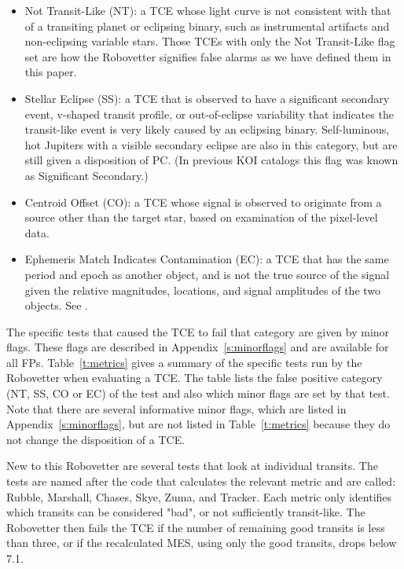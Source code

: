 \begin{itemize}
  \item Not Transit-Like (NT): a TCE whose light curve is not consistent with that of a transiting planet or eclipsing binary, such as instrumental artifacts and non-eclipsing variable stars. Those TCEs  with only the Not Transit-Like flag set are how the Robovetter signifies false alarms as we have defined them in this paper. 
  \item  Stellar Eclipse (SS): a TCE that is observed to have a significant secondary event, v-shaped transit profile, or out-of-eclipse variability that indicates the transit-like event is very likely caused by an eclipsing binary. Self-luminous, hot Jupiters with a visible secondary eclipse are also in this category, but are still given a disposition of PC. (In previous KOI catalogs this flag was known as Significant Secondary.)
  \item Centroid Offset (CO): a TCE whose signal is observed to originate from a source other than the target star, based on examination of the pixel-level data.
  \item Ephemeris Match Indicates Contamination (EC): a TCE that has the same period and epoch as another object, and is not the true source of the signal given the relative magnitudes, locations, and signal amplitudes of the two objects. See \citet{Coughlin2014}.
\end{itemize}

The specific tests that caused the TCE to fail that category are given by minor flags. These flags are described in Appendix~\ref{s:minorflags} and are available for all FPs.  Table~\ref{t:metrics} gives a summary of the specific tests run by the Robovetter when evaluating a TCE.  The table lists the false positive category (NT, SS, CO or EC) of the test and also which minor flags are set by that test.  Note that there are several informative minor flags, which are listed in Appendix~\ref{s:minorflags}, but are not listed in Table~\ref{t:metrics} because they do not change the disposition of a TCE.

New to this Robovetter are several tests that look at individual transits. The tests are named after the code that calculates the relevant metric and are called: Rubble, Marshall, Chases, Skye, Zuma, and Tracker.  Each metric only identifies which transits can be considered "bad", or not sufficiently transit-like.  The Robovetter then fails the TCE if the number of remaining good transits is less than three, or if the recalculated MES, using only the good transits, drops below 7.1.

